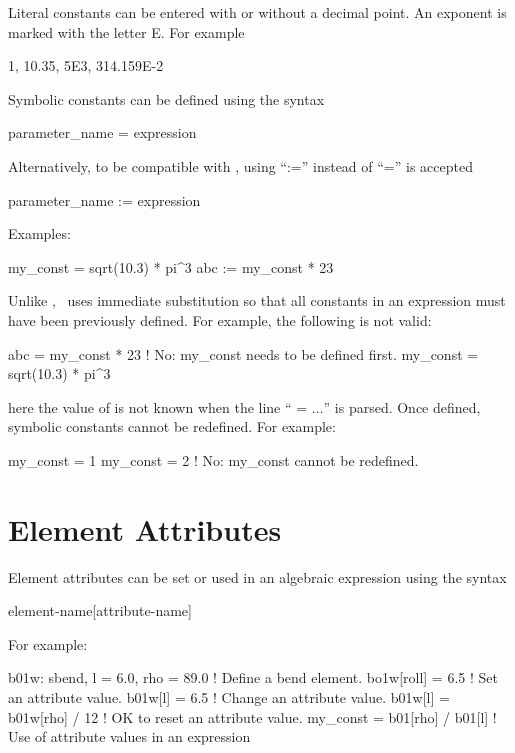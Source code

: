 Literal constants can be entered with or without a decimal point. An
exponent is marked with the letter E. For example
\begin{example}
  1, 10.35, 5E3, 314.159E-2
\end{example}
Symbolic constants can be defined using the syntax
\begin{example}
  parameter_name = expression
\end{example}
Alternatively, to be compatible with \mad, using ``:='' instead of ``='' is accepted
\begin{example}
  parameter_name := expression
\end{example}
Examples:
\begin{example}
  my_const = sqrt(10.3) * pi^3
  abc     := my_const * 23
\end{example}
Unlike \mad, \bmad\ uses immediate substitution so that all constants
in an expression must have been previously defined. For example, the
following is not valid:
\begin{example}
  abc      = my_const * 23      ! No: my_const needs to be defined first.
  my_const = sqrt(10.3) * pi^3
\end{example}
here the value of  is not known when the line ``
= $\ldots$'' is parsed. Once
defined, symbolic constants cannot be redefined. For example:
\begin{example}
  my_const = 1
  my_const = 2  ! No: my_const cannot be redefined.
\end{example}


\section{Element Attributes}

Element attributes can be set or used in an algebraic expression
using the syntax
\begin{example}
  element-name[attribute-name]
\end{example}
For example:
\begin{example}
  b01w: sbend, l = 6.0, rho = 89.0   ! Define a bend element.
  bo1w[roll] = 6.5                   ! Set an attribute value.
  b01w[l] = 6.5                      ! Change an attribute value.
  b01w[l] = b01w[rho] / 12           ! OK to reset an attribute value.
  my_const = b01[rho] / b01[l]       ! Use of attribute values in an expression
\end{example}

